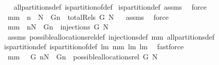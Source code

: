 \begin{isabellebody}
\isadelimproof
\ %
\endisadelimproof
%
\isatagproof
{}\isamarkupfalse%
\ all{\isacharunderscore}partitions{\isacharunderscore}def\ is{\isacharunderscore}partition{\isacharunderscore}of{\isacharunderscore}def\ \isanewline
is{\isacharunderscore}partition{\isacharunderscore}def\ assms\ \isamarkupfalse%
\ force%
\endisatagproof
{\isafoldproof}%
%
\isadelimproof
%
\endisadelimproof
\isanewline
{}\isamarkupfalse%
\ mm{}{}{\isacharcolon}\ \ {\isachardoublequoteopen}n\ {\isasymin}\ N{\isachardoublequoteclose}\ \ {\isachardoublequoteopen}{\isacharbraceleft}{\isacharparenleft}G{\isacharcomma}n{\isacharparenright}{\isacharbraceright}\ {\isasymin}\ totalRels\ {\isacharbraceleft}G{\isacharbraceright}\ N{\isachardoublequoteclose}%
\isadelimproof
\ %
\endisadelimproof
%
\isatagproof
{}\isamarkupfalse%
\ assms\ \isamarkupfalse%
\ force%
\endisatagproof
{\isafoldproof}%
%
\isadelimproof
%
\endisadelimproof
\isanewline
{}\isamarkupfalse%
\ mm{}{}{\isacharcolon}\ \ {\isachardoublequoteopen}n{\isasymin}N{\isachardoublequoteclose}\ \ {\isachardoublequoteopen}{\isacharbraceleft}{\isacharparenleft}G{\isacharcomma}n{\isacharparenright}{\isacharbraceright}\ {\isasymin}\ injections\ {\isacharbraceleft}G{\isacharbraceright}\ N{\isachardoublequoteclose}\ \isanewline
%
\isadelimproof
%
\endisadelimproof
%
\isatagproof
{}\isamarkupfalse%
\ assms\ possible{\isacharunderscore}allocations{\isacharunderscore}rel{\isacharunderscore}def\ injections{\isacharunderscore}def\ mm{}{}\ all{\isacharunderscore}partitions{\isacharunderscore}def\ \isanewline
is{\isacharunderscore}partition{\isacharunderscore}def\ is{\isacharunderscore}partition{\isacharunderscore}of{\isacharunderscore}def\ lm{}{}\ mm{}{}\ lm{}{}\ lm{}{}\ \isamarkupfalse%
\ fastforce%
\endisatagproof
{\isafoldproof}%
%
\isadelimproof
\isanewline
%
\endisadelimproof
{}\isamarkupfalse%
\ mm{}{}{\isacharcolon}\ \ {\isachardoublequoteopen}\ G{\isasymnoteq}{\isacharbraceleft}{\isacharbraceright}{\isachardoublequoteclose}\ {\isachardoublequoteopen}n{\isasymin}N{\isachardoublequoteclose}\ \ {\isachardoublequoteopen}{\isacharbraceleft}{\isacharparenleft}G{\isacharcomma}n{\isacharparenright}{\isacharbraceright}\ {\isasymin}\ possible{\isacharunderscore}allocations{\isacharunderscore}rel\ G\ N{\isachardoublequoteclose}\isanewline

\end{isabellebody}
